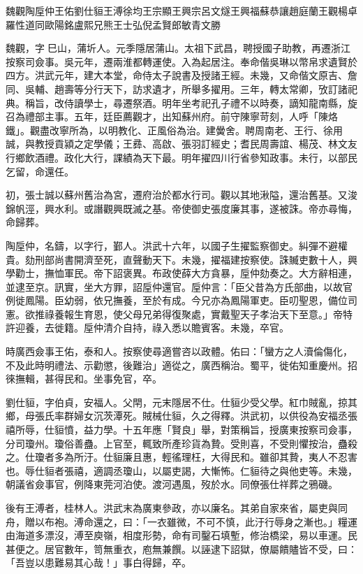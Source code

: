 
\begin{pinyinscope}
魏觀陶垕仲王佑劉仕貆王溥徐均王宗顯王興宗呂文燧王興福蘇恭讓趙庭蘭王觀楊卓羅性道同歐陽銘盧熙兄熊王士弘倪孟賢郎敏青文勝

魏觀，字巳山，蒲圻人。元季隱居蒲山。太祖下武昌，聘授國子助教，再遷浙江按察司僉事。吳元年，遷兩淮都轉運使。入為起居注。奉命偕吳琳以幣帛求遺賢於四方。洪武元年，建大本堂，命侍太子說書及授諸王經。未幾，又命偕文原吉、詹同、吳輔、趙壽等分行天下，訪求遺才，所舉多擢用。三年，轉太常卿，攷訂諸祀典。稱旨，改侍讀學士，尋遷祭酒。明年坐考祀孔子禮不以時奏，謫知龍南縣，旋召為禮部主事。五年，廷臣薦觀才，出知蘇州府。前守陳寧苛刻，人呼「陳烙鐵」。觀盡改寧所為，以明教化、正風俗為治。建黌舍。聘周南老、王行、徐用誠，與教授貢潁之定學儀；王彞、高啟、張羽訂經史；耆民周壽誼、楊茂、林文友行鄉飲酒禮。政化大行，課績為天下最。明年擢四川行省參知政事。未行，以部民乞留，命還任。

初，張士誠以蘇州舊治為宮，遷府治於都水行司。觀以其地湫隘，還治舊基。又浚錦帆涇，興水利。或譖觀興既滅之基。帝使御史張度廉其事，遂被誅。帝亦尋悔，命歸葬。

陶垕仲，名鑄，以字行，鄞人。洪武十六年，以國子生擢監察御史。糾彈不避權貴。劾刑部尚書開濟至死，直聲動天下。未幾，擢福建按察使。誅贓吏數十人，興學勸士，撫恤軍民。帝下詔褒異。布政使薛大方貪暴，垕仲劾奏之。大方辭相連，並逮至京。訊實，坐大方罪，詔垕仲還官。垕仲言：「臣父昔為方氏部曲，以故官例徙鳳陽。臣幼弱，依兄撫養，至於有成。今兄亦為鳳陽軍吏。臣叨聖恩，備位司憲。欲推祿養報生育恩，使父母兄弟得復聚處，實戴聖天子孝治天下至意。」帝特許迎養，去徙籍。垕仲清介自持，祿入悉以贍賓客。未幾，卒官。

時廣西僉事王佑，泰和人。按察使尋適嘗咨以政體。佑曰：「蠻方之人瀆倫傷化，不及此時明禮法、示勸懲，後難治」適從之，廣西稱治。蜀平，徙佑知重慶州。招徠撫輯，甚得民和。坐事免官，卒。

劉仕貆，字伯貞，安福人。父閈，元末隱居不仕。仕貆少受父學。紅巾賊亂，掠其鄉，母張氏率群婦女沉茨潭死。賊械仕貆，久之得釋。洪武初，以供役為安福丞張禧所辱，仕貆憤，益力學。十五年應「賢良」舉，對策稱旨，授廣東按察司僉事，分司瓊州。瓊俗善蠱。上官至，輒致所產珍貨為贄。受則喜，不受則懼按治，蠱殺之。仕瓊者多為所汙。仕貆廉且惠，輕徭理枉，大得民和。雖卻其贄，夷人不忍害也。辱仕貆者張禧，適調丞瓊山，以屬吏謁，大慚怖。仁貆待之與他吏等。未幾，朝議省僉事官，例降東莞河泊使。渡河遇風，歿於水。同僚張仕祥葬之鴉磯。

後有王溥者，桂林人。洪武末為廣東參政，亦以廉名。其弟自家來省，屬吏與同舟，贈以布袍。溥命還之，曰：「一衣雖微，不可不慎，此汙行辱身之漸也。」糧運由海道多漂沒，溥至庾嶺，相度形勢，命有司鑿石填塹，修治橋梁，易以車運。民甚便之。居官數年，笥無重衣，庖無兼饌。以誣逮下詔獄，僚屬饋贐皆不受，曰：「吾豈以患難易其心哉！」事白得歸，卒。


\end{pinyinscope}
